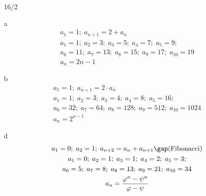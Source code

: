 \begin{exercise}{16/2}
  \item [a]
  \begin{gather*}
    a_1 = 1;\; a_{n + 1} = 2 + a_n \\
    a_1 = 1;\; a_2 = 3;\; a_3 = 5;\; a_4 = 7;\; a_5 = 9;\\
    a_6 = 11;\; a_7 = 13;\; a_8 = 15;\; a_9 = 17;\; a_{10} = 19\\
    a_n = 2n - 1
  \end{gather*}
  \item [b]
  \begin{gather*}
    a_1 = 1;\; a_{n + 1} = 2 \cdot a_n \\
    a_1 = 1;\; a_2 = 3;\; a_3 = 4;\; a_4 = 8;\; a_5 = 16;\\
    a_6 = 32;\; a_7 = 64;\; a_8 = 128;\; a_9 = 512;\; a_{10} = 1024\\
    a_n = 2^{n - 1}
  \end{gather*}
  \item [d]
  \begin{gather*}
    a_1 = 0;\; a_2 = 1;\; a_{n + 2} = a_n + a_{n + 1}\gap \text{(Fibonacci)} \\
    a_1 = 0;\; a_2 = 1;\; a_3 = 1;\; a_4 = 2;\; a_5 = 3;\\
    a_6 = 5;\; a_7 = 8;\; a_8 = 13;\; a_9 = 21;\; a_{10} = 34\\
    a_n = \frac{\varphi^n - \psi^n}{\varphi - \psi}
  \end{gather*}
\end{exercise}

